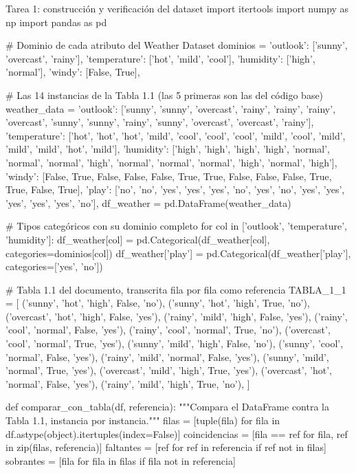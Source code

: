 \documentclass[11pt,letterpaper]{article}
\begin{document}
\begin{codigo}[label=cod:tarea1]{Tarea 1: construcción y verificación del dataset}
import itertools
import numpy as np
import pandas as pd

# Dominio de cada atributo del Weather Dataset
dominios = {
    'outlook': ['sunny', 'overcast', 'rainy'],
    'temperature': ['hot', 'mild', 'cool'],
    'humidity': ['high', 'normal'],
    'windy': [False, True],
}

# Las 14 instancias de la Tabla 1.1 (las 5 primeras son las del código base)
weather_data = {
    'outlook': ['sunny', 'sunny', 'overcast', 'rainy', 'rainy', 'rainy', 'overcast',
                'sunny', 'sunny', 'rainy', 'sunny', 'overcast', 'overcast', 'rainy'],
    'temperature': ['hot', 'hot', 'hot', 'mild', 'cool', 'cool', 'cool',
                    'mild', 'cool', 'mild', 'mild', 'mild', 'hot', 'mild'],
    'humidity': ['high', 'high', 'high', 'high', 'normal', 'normal', 'normal',
                 'high', 'normal', 'normal', 'normal', 'high', 'normal', 'high'],
    'windy': [False, True, False, False, False, True, True,
              False, False, False, True, True, False, True],
    'play': ['no', 'no', 'yes', 'yes', 'yes', 'no', 'yes',
             'no', 'yes', 'yes', 'yes', 'yes', 'yes', 'no'],
}
df_weather = pd.DataFrame(weather_data)

# Tipos categóricos con su dominio completo
for col in ['outlook', 'temperature', 'humidity']:
    df_weather[col] = pd.Categorical(df_weather[col], categories=dominios[col])
df_weather['play'] = pd.Categorical(df_weather['play'], categories=['yes', 'no'])

# Tabla 1.1 del documento, transcrita fila por fila como referencia
TABLA_1_1 = [
    ('sunny', 'hot', 'high', False, 'no'),
    ('sunny', 'hot', 'high', True, 'no'),
    ('overcast', 'hot', 'high', False, 'yes'),
    ('rainy', 'mild', 'high', False, 'yes'),
    ('rainy', 'cool', 'normal', False, 'yes'),
    ('rainy', 'cool', 'normal', True, 'no'),
    ('overcast', 'cool', 'normal', True, 'yes'),
    ('sunny', 'mild', 'high', False, 'no'),
    ('sunny', 'cool', 'normal', False, 'yes'),
    ('rainy', 'mild', 'normal', False, 'yes'),
    ('sunny', 'mild', 'normal', True, 'yes'),
    ('overcast', 'mild', 'high', True, 'yes'),
    ('overcast', 'hot', 'normal', False, 'yes'),
    ('rainy', 'mild', 'high', True, 'no'),
]


def comparar_con_tabla(df, referencia):
    """Compara el DataFrame contra la Tabla 1.1, instancia por instancia."""
    filas = [tuple(fila) for fila in df.astype(object).itertuples(index=False)]
    coincidencias = [fila == ref for fila, ref in zip(filas, referencia)]
    faltantes = [ref for ref in referencia if ref not in filas]
    sobrantes = [fila for fila in filas if fila not in referencia]


\end{codigo}
\end{document}
